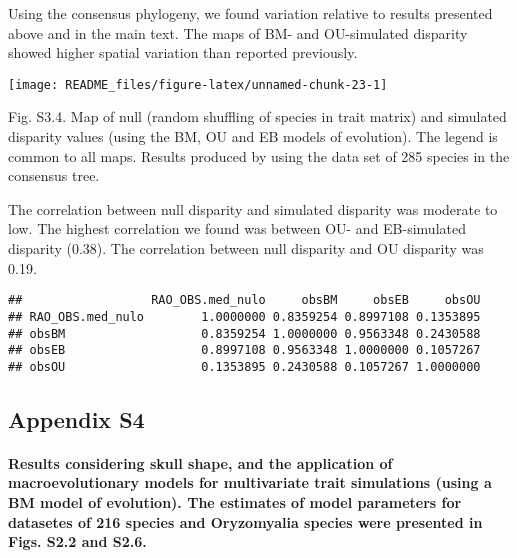 \documentclass[
]{article}
\begin{document}
Using the consensus phylogeny, we found variation relative to results
presented above and in the main text. The maps of BM- and OU-simulated
disparity showed higher spatial variation than reported previously.

\begin{center}\texttt{[image: README\_files/figure-latex/unnamed-chunk-23-1]} \end{center}

Fig. S3.4. Map of null (random shuffling of species in trait matrix) and
simulated disparity values (using the BM, OU and EB models of
evolution). The legend is common to all maps. Results produced by using
the data set of 285 species in the consensus tree.

The correlation between null disparity and simulated disparity was
moderate to low. The highest correlation we found was between OU- and
EB-simulated disparity (0.38). The correlation between null disparity
and OU disparity was 0.19.

\begin{verbatim}
##                  RAO_OBS.med_nulo     obsBM     obsEB     obsOU
## RAO_OBS.med_nulo        1.0000000 0.8359254 0.8997108 0.1353895
## obsBM                   0.8359254 1.0000000 0.9563348 0.2430588
## obsEB                   0.8997108 0.9563348 1.0000000 0.1057267
## obsOU                   0.1353895 0.2430588 0.1057267 1.0000000
\end{verbatim}

\newpage

\hypertarget{appendix-s4}{%
\subsection{Appendix S4}\label{appendix-s4}}

\hypertarget{results-considering-skull-shape-and-the-application-of-macroevolutionary-models-for-multivariate-trait-simulations-using-a-bm-model-of-evolution.-the-estimates-of-model-parameters-for-datasetes-of-216-species-and-oryzomyalia-species-were-presented-in-figs.-s2.2-and-s2.6.}{%
\paragraph{Results considering skull shape, and the application of
macroevolutionary models for multivariate trait simulations (using a BM
model of evolution). The estimates of model parameters for datasetes of
216 species and Oryzomyalia species were presented in Figs. S2.2 and
S2.6.}\label{results-considering-skull-shape-and-the-application-of-macroevolutionary-models-for-multivariate-trait-simulations-using-a-bm-model-of-evolution.-the-estimates-of-model-parameters-for-datasetes-of-216-species-and-oryzomyalia-species-were-presented-in-figs.-s2.2-and-s2.6.}}
\end{document}
